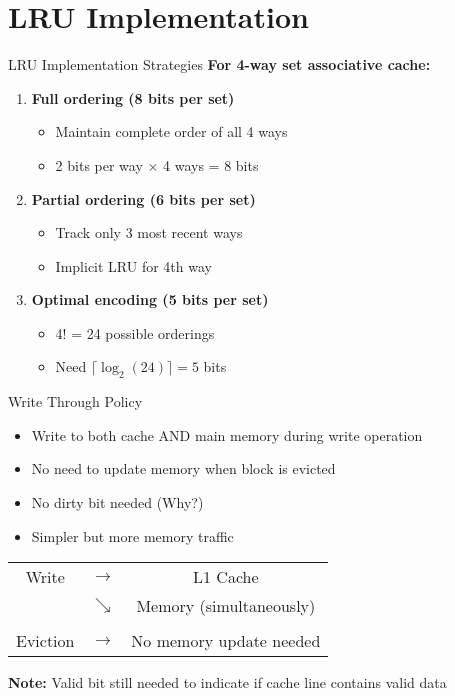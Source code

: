 \documentclass[aspectratio=169,12pt]{beamer}
\begin{document}
\section{LRU Implementation}
\begin{frame}{LRU Implementation Strategies}
\textbf{For 4-way set associative cache:}

\begin{enumerate}
    \item \textbf{Full ordering (8 bits per set)}
    \begin{itemize}
        \item Maintain complete order of all 4 ways
        \item 2 bits per way $\times$ 4 ways = 8 bits
    \end{itemize}
    
    \item \textbf{Partial ordering (6 bits per set)}
    \begin{itemize}
        \item Track only 3 most recent ways
        \item Implicit LRU for 4th way
    \end{itemize}
    
    \item \textbf{Optimal encoding (5 bits per set)}
    \begin{itemize}
        \item 4! = 24 possible orderings
        \item Need $\lceil \log_2(24) \rceil = 5$ bits
    \end{itemize}
\end{enumerate}
\end{frame}

\begin{frame}{Write Through Policy}
\begin{itemize}
    \item Write to both cache AND main memory during write operation
    \item No need to update memory when block is evicted
    \item \alert{No dirty bit needed} (Why?)
    \item Simpler but more memory traffic
\end{itemize}

\begin{center}
\begin{tcolorbox}[colback=green!10, width=0.8\textwidth]
\begin{tabular}{c c c}
Write & $\rightarrow$ & L1 Cache \\
      & $\searrow$ & Memory (simultaneously)\\
& & \\
Eviction & $\rightarrow$ & No memory update needed
\end{tabular}
\end{tcolorbox}
\end{center}

\textbf{Note:} Valid bit still needed to indicate if cache line contains valid data
\end{frame}
\end{document}
